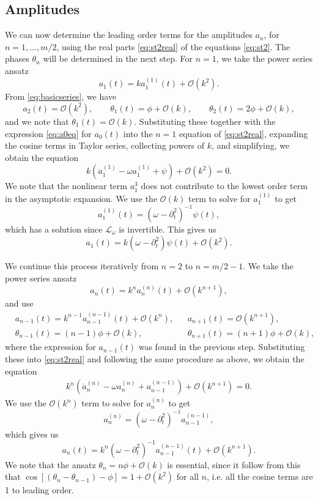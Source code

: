\documentclass[11pt,reqno]{amsart}
\def\Lw{{\mathcal{L}_\omega}}
\begin{document}
\subsection{Amplitudes}
We can now determine the leading order terms for the amplitudes $a_n$, for $n = 1, \dots, m/2$, using the real parts \cref{eq:st2real} of the equations \cref{eq:st2}. The phases $\theta_n$ will be determined in the next step. For $n=1$, we take the power series ansatz 
\[
a_1(t) = k a_1^{(1)}(t) + \mathcal{O}(k^2).
\]
From \cref{eq:basicseries}, we have
\[
a_2(t) = \mathcal{O}(k^2), \qquad \theta_1(t) = \phi + \mathcal{O}(k), \qquad \theta_2(t) = 2 \phi + \mathcal{O}(k),
\]
and we note that $\dot \theta_1(t) = \mathcal{O}(k)$. Substituting these together with the expression \cref{eq:a0eq} for $a_0(t)$ into the $n=1$ equation of \cref{eq:st2real}, expanding the cosine terms in Taylor series, collecting powers of $k$, and simplifying, we obtain the equation
\[
k\left(\ddot a_1^{(1)} - \omega a_1^{(1)} + \psi\right) + \mathcal{O}(k^2) = 0.
\]
We note that the nonlinear term $a_1^3$ does not contribute to the lowest order term in the asymptotic expansion. We use the $\mathcal{O}(k)$ term to solve for $a_1^{(1)}$ to get 
\begin{equation}\label{eq:a11}
a_1^{(1)}(t) = (\omega - \partial_t^2)^{-1} \psi(t),
\end{equation}
which has a solution since $\Lw$ is invertible. This gives us
\begin{equation}\label{eq:a1eq}
a_1(t) = k (\omega - \partial_t^2) \psi(t) + \mathcal{O}(k^2).
\end{equation}

We continue this process iteratively from $n=2$ to $n=m/2-1$. We take the power series ansatz 
\[
a_n(t) = k^n a_n^{(n)}(t) + \mathcal{O}(k^{n+1}),
\]
and use
\begin{align*}
&a_{n-1}(t) = k^{n-1} a_{n-1}^{(n-1)}(t) + \mathcal{O}(k^{n}), &&a_{n+1}(t) = \mathcal{O}(k^{n+1}), \\
&\theta_{n-1}(t) = (n-1) \phi + \mathcal{O}(k), &&\theta_{n+1}(t) = (n+1) \phi + \mathcal{O}(k),
\end{align*}
where the expression for $a_{n-1}(t)$ was found in the previous step. Substituting these into \cref{eq:st2real} and following the same procedure as above, we obtain the equation
\begin{align*}
k^n\left(\ddot a_n^{(n)} - \omega a_n^{(n)} + a_{n-1}^{(n-1)}\right) +\mathcal{O}(k^{n+1}) = 0.
\end{align*}
We use the $\mathcal{O}(k^n)$ term to solve for $a_n^{(n)}$ to get 
\begin{equation}\label{eq:ann}
a_n^{(n)} = (\omega - \partial_t^2)^{-1}a_{n-1}^{(n-1)},
\end{equation}
which gives us
\begin{equation}\label{eq:aneq}
a_n(t) = k^n (\omega - \partial_t^2)^{-1}a_{n-1}^{(n-1)}(t) + \mathcal{O}(k^{n+1}).
\end{equation}
We note that the ansatz $\theta_n = n \phi + \mathcal{O}(k)$ is essential, since it follow from this that $\cos[(\theta_n - \theta_{n-1}) - \phi] = 1 + \mathcal{O}(k^2)$ for all $n$, i.e. all the cosine terms are 1 to leading order. 
\end{document}
